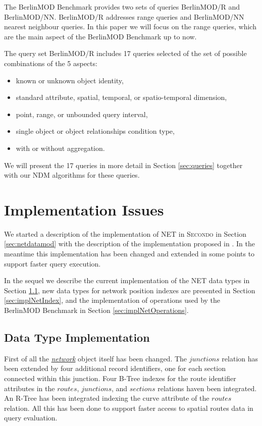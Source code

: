 \documentclass[a4paper]{article}
\newcommand{\secondo}{\textsc{Secondo}}
\newcommand{\bmodb} {BerlinMOD Benchmark}
\newcommand{\dt}[1]{\textsl{\underline{#1}}}
\begin{document}
The \bmodb{} provides two sets of queries BerlinMOD/R and BerlinMOD/NN.
BerlinMOD/R addresses range queries and BerlinMOD/NN nearest neighbour queries.
In this paper we will focus on the range queries, which are the main aspect of the
\bmodb{} up to now.

The query set BerlinMOD/R includes 17 queries selected of the set of possible
combinations of the 5 aspects:
\begin{itemize}
  \item known or unknown object identity,
  \item standard attribute, spatial, temporal, or spatio-temporal dimension,
  \item point, range, or unbounded query interval,
  \item single object or object relationships condition type,
  \item with or without aggregation.
\end{itemize}
We will present the 17 queries in more detail in Section
\ref{sec:queries}
together with our NDM algorithms for these queries.
\section{Implementation Issues}
\label{sec:implNDM}
We started a description of the implementation of NET in \secondo{} in Section
\ref{sec:netdatamod} with the description of the implementation proposed in
\cite{NetworkGueting}. In the meantime this implementation has been changed and
extended in some points to support faster query execution.

In the sequel we describe the current implementation of the NET data types in
Section \ref{sec:implNetDataTyp}, new data types for network position indexes
are presented in Section \ref{sec:implNetIndex}, and the implementation of
operations used by the \bmodb{} in Section \ref{sec:implNetOperations}.

\subsection{Data Type Implementation}
\label{sec:implNetDataTyp}
First of all the \dt{network} object itself has been changed. The $junctions$
relation has been extended by four additional record identifiers, one for each
section connected within this junction. Four B-Tree indexes for the route
identifier attributes in the $routes$, $junctions$, and $sections$ relations
haven been integrated. An R-Tree has been integrated indexing the curve attribute
of the $routes$ relation. All this has been done to support faster access to
spatial routes data in query evaluation.
\end{document}
